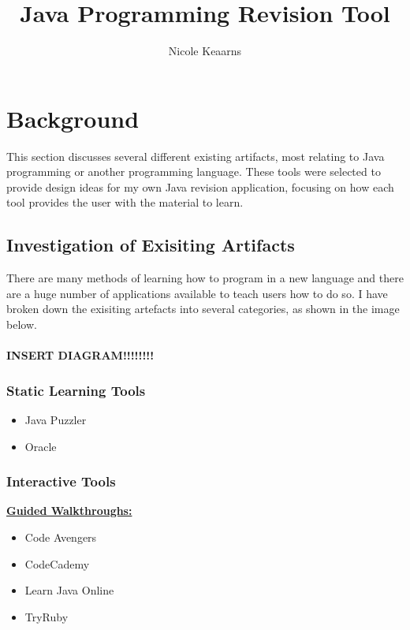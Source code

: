 \documentclass{article}
\begin{document}
\title{Java Programming Revision Tool}
\author{Nicole Keaarns}
\maketitle
\tableofcontents

\newpage

\section{Background}

This section discusses several different existing artifacts, most relating to Java programming or another programming language. These tools were selected to provide design ideas for my own Java revision application, focusing on how each tool provides the user with the material to learn.

\subsection{Investigation of Exisiting Artifacts}

There are many methods of learning how to program in a new language and there are a huge number of applications available to teach users how to do so. I have broken down the exisiting artefacts into several categories, as shown in the image below.\\
\\
\textbf{INSERT DIAGRAM!!!!!!!!}


\subsubsection{Static Learning Tools}

\begin{itemize}
\item Java Puzzler
\item Oracle
\end{itemize}

\subsubsection{Interactive Tools}

\textbf{\underline{Guided Walkthroughs:}}\\

\begin{itemize}
\item Code Avengers
\item CodeCademy
\item Learn Java Online
\item TryRuby
\end{itemize}
\end{document}
